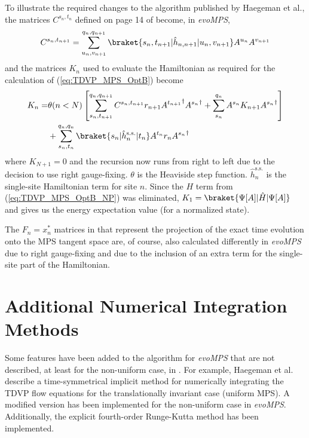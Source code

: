 \documentclass[a4paper,11pt]{article}
\begin{document}
To illustrate the required changes to the algorithm published by Haegeman et al., 
the matrices $C^{s_n,t_n}$ defined on page 14 of 
\cite{haegeman_time-dependent_2011} become, in \emph{evoMPS},
\begin{equation}
	C^{s_n, t_{n + 1}} = \sum_{u_n, v_{n + 1}}^{q_n, q_{n+1}} \braket{s_n, t_{n + 1} | \hat{h}_{n, n + 1} | u_n, v_{n + 1}} A^{u_n} A^{v_{n+1}}
\end{equation}
and the matrices $K_n$ used to evaluate the Hamiltonian as required for the calculation of
(\ref{eq:TDVP_MPS_OptB}) become
\begin{align}
	\nonumber K_n = & \theta(n < N) \left[ \sum_{s_n, t_{n + 1}}^{q_n, q_{n+1}} C^{s_n, t_{n + 1}} r_{n+1} {A^{t_{n + 1}}}^\dagger {A^{s_{n}}}^\dagger + \sum_{s_n}^{q_n} A^{s_n}K_{n+1}{A^{s_n}}^\dagger \right] \\
	&  + \sum_{s_n, t_n}^{q_n, q_n} \braket{s_n | \hat{h}_n^{\mathrm{s.s.}} | t_n} A^{t_n} r_n {A^{s_n}}^\dagger
\end{align}
where $K_{N+1} = 0$ and the recursion now runs from right to left due to the decision to use right gauge-fixing. $\theta$ is the Heaviside step function. $\hat{h}^\mathrm{s.s.}_n$ is the single-site Hamiltonian term
for site $n$. Since the $H$ term from (\ref{eq:TDVP_MPS_OptB_NP}) was eliminated, 
$K_1 = \braket{\Psi[A] | \hat{H} | \Psi[A]}$ and gives us the energy expectation value (for a normalized state).

The $F_n = x_n^*$ matrices in \cite{haegeman_time-dependent_2011} that represent the projection of the exact time evolution onto the MPS
tangent space are, of course, also calculated differently in \emph{evoMPS} due to right gauge-fixing and
due to the inclusion of an extra term for the single-site part of the Hamiltonian.

\section{Additional Numerical Integration Methods}
Some features have been added to the algorithm for \emph{evoMPS} that are not described,
at least for the non-uniform case, in \cite{haegeman_time-dependent_2011}. For example,
Haegeman et al. describe a time-symmetrical implicit method for numerically integrating
the TDVP flow equations for the translationally invariant case (uniform MPS). A modified
version has been implemented for the non-uniform case in \emph{evoMPS}.
Additionally, the explicit fourth-order Runge-Kutta method has been implemented.
\end{document}

